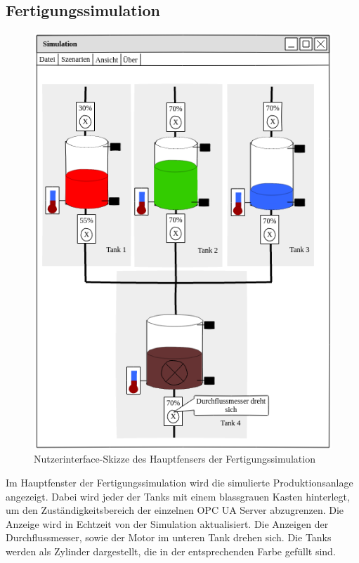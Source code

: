 \documentclass[parskip=full]{scrartcl}
\begin{document}
\subsection{Fertigungssimulation}
\begin{figure}[H]
  \centering
  \includegraphics[scale=0.5]{media/ui-server/ui-server-main.png}
  \caption{Nutzerinterface-Skizze des Hauptfensers der Fertigungssimulation}
\end{figure}
Im Hauptfenster der \gls{Fertigungssimulation} wird die simulierte \gls{Produktionsanlage} angezeigt. Dabei wird jeder der Tanks
mit einem blassgrauen Kasten hinterlegt, um den Zuständigkeitsbereich der einzelnen \gls{OPC UA Server} abzugrenzen. Die Anzeige wird
in Echtzeit von der Simulation aktualisiert. Die Anzeigen der Durchflussmesser, sowie der Motor im unteren Tank drehen sich.
Die Tanks werden als Zylinder dargestellt, die in der entsprechenden Farbe gefüllt sind.
\end{document}
